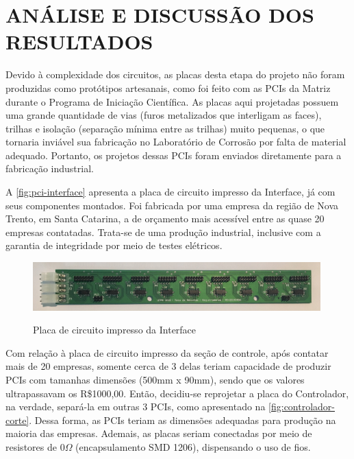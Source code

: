 
\chapter{ANÁLISE E DISCUSSÃO DOS RESULTADOS}
\label{chap:analise-resultados}

Devido à complexidade dos circuitos, as placas desta etapa do projeto não foram produzidas como protótipos artesanais, como foi feito com as PCIs da Matriz durante o Programa de Iniciação Científica. As placas aqui projetadas possuem uma grande quantidade de vias (furos metalizados que interligam as faces), trilhas e isolação (separação mínima entre as trilhas) muito pequenas, o que tornaria inviável sua fabricação no Laboratório de Corrosão por falta de material adequado. Portanto, os projetos dessas PCIs foram enviados diretamente para a fabricação industrial.

A \autoref{fig:pci-interface} apresenta a placa de circuito impresso da Interface, já com seus componentes montados. Foi fabricada por uma empresa da região de Nova Trento, em Santa Catarina, a de orçamento mais acessível entre as quase 20 empresas contatadas. Trata-se de uma produção industrial, inclusive com a garantia de integridade por meio de testes elétricos.

\begin{figure}[H]
    \centering
    \caption{Placa de circuito impresso da Interface}
    \includegraphics[width=0.99\textwidth]{./dados/figuras/pci-interface}
    \label{fig:pci-interface}
\end{figure}

Com relação à placa de circuito impresso da seção de controle, após contatar mais de 20 empresas, somente cerca de 3 delas teriam capacidade de produzir PCIs com tamanhas dimensões (500mm x 90mm), sendo que os valores ultrapassavam os R\$1000,00. Então, decidiu-se reprojetar a placa do Controlador, na verdade, separá-la em outras 3 PCIs, como apresentado na \autoref{fig:controlador-corte}. Dessa forma, as PCIs teriam as dimensões adequadas para produção na maioria das empresas. Ademais, as placas seriam conectadas por meio de resistores de $0\Omega$ (encapsulamento SMD 1206), dispensando o uso de fios. 

